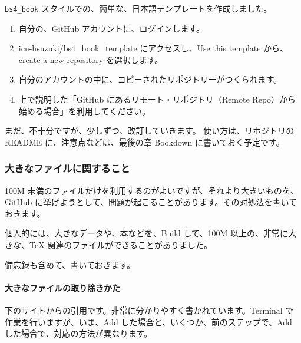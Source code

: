 \documentclass[
]{bxjsbook}
\providecommand{\tightlist}{%
  \setlength{\itemsep}{0pt}\setlength{\parskip}{0pt}}
\theoremstyle{definition}
\theoremstyle{definition}
\theoremstyle{definition}
\theoremstyle{definition}
\theoremstyle{remark}
\begin{document}
\texttt{bs4\_book} スタイルでの、簡単な、日本語テンプレートを作成しました。

\begin{enumerate}
\def\labelenumi{\arabic{enumi}.}
\tightlist
\item
  自分の、GitHub アカウントに、ログインします。
\item
  \href{https://github.com/icu-hsuzuki/bs4_book_template}{icu-hsuzuki/bs4\_book\_template} にアクセスし、Use this template から、create a new repository を選択します。
\item
  自分のアカウントの中に、コピーされたリポジトリーがつくられます。
\item
  上で説明した「GitHub にあるリモート・リポジトリ（Remote Repo）から始める場合」を利用してください。
\end{enumerate}

まだ、不十分ですが、少しずつ、改訂していきます。
使い方は、リポジトリの README に、注意点などは、最後の章 Bookdown に書いておく予定です。

\hypertarget{ux5927ux304dux306aux30d5ux30a1ux30a4ux30ebux306bux95a2ux3059ux308bux3053ux3068}{%
\subsubsection{大きなファイルに関すること}\label{ux5927ux304dux306aux30d5ux30a1ux30a4ux30ebux306bux95a2ux3059ux308bux3053ux3068}}

100M 未満のファイルだけを利用するのがよいですが、それより大きいものを、GitHub に挙げようとして、問題が起こることがあります。その対処法を書いておきます。

個人的には、大きなデータや、本などを、Build して、100M 以上の、非常に大きな、TeX 関連のファイルができることがありました。

備忘録も含めて、書いておきます。

\hypertarget{ux5927ux304dux306aux30d5ux30a1ux30a4ux30ebux306eux53d6ux308aux9664ux304dux304bux305f}{%
\paragraph{大きなファイルの取り除きかた}\label{ux5927ux304dux306aux30d5ux30a1ux30a4ux30ebux306eux53d6ux308aux9664ux304dux304bux305f}}

下のサイトからの引用です。非常に分かりやすく書かれています。Terminal で作業を行いますが、いま、Add した場合と、いくつか、前のステップで、Add した場合で、対応の方法が異なります。
\end{document}
